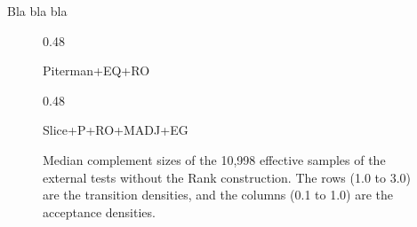 Bla bla bla


\renewcommand{\arraystretch}{1.4}
\newcommand{\subwidth}{0.48}



\begin{figure}[h]
  \centering
  \begin{scriptsize}
  \renewcommand{\tabcolsep}{0.05cm}
  \begin{subtable}[t]{\subwidth\textwidth}
    \centering
    
    \caption{Piterman+EQ+RO}
  \end{subtable}
  \hfill
  \begin{subtable}[t]{\subwidth\textwidth}
    \centering
    
    \caption{Slice+P+RO+MADJ+EG}
  \end{subtable}
\end{scriptsize}
\caption{Median complement sizes of the 10,998 effective samples of the external tests without the Rank construction. The rows (1.0 to 3.0) are the transition densities, and the columns (0.1 to 1.0) are the acceptance densities.}
\end{figure}

